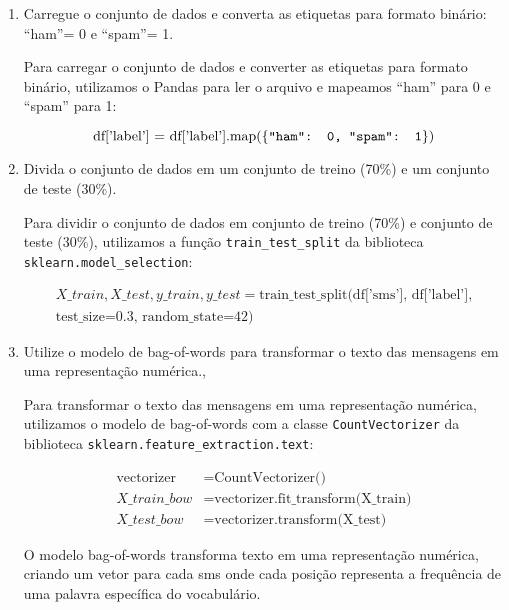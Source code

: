 \begin{enumerate}
    \item Carregue o conjunto de dados e converta as etiquetas para formato binário: ``ham''= 0 e ``spam''= 1.
    \begin{tcolorbox}[title=Resposta:]
        Para carregar o conjunto de dados e converter as etiquetas para formato binário, utilizamos o Pandas para ler o arquivo e mapeamos ``ham'' para 0 e ``spam'' para 1:
        
        \[
        \text{df['label'] = df['label'].map(\{\texttt{``ham'': 0, ``spam'': 1}\})}
        \]
        \end{tcolorbox}
        
        
    \item Divida o conjunto de dados em um conjunto de treino (70\%) e um conjunto de teste (30\%).
    \begin{tcolorbox}[title=Resposta:]
        Para dividir o conjunto de dados em conjunto de treino (70\%) e conjunto de teste (30\%), utilizamos a função \texttt{train\_test\_split} da biblioteca \texttt{sklearn.model\_selection}:
        
        \[
        \begin{aligned}
        X\_train, X\_test, y\_train, y\_test = 
        \text{train\_test\_split(df['sms'], df['label'],} \\
        \text{test\_size=0.3, random\_state=42)}
        \end{aligned}
        \]
        \end{tcolorbox}
        
        
    \item Utilize o modelo de bag-of-words para transformar o texto das mensagens em uma representação numérica.,
    \begin{tcolorbox}[title=Resposta:]
        Para transformar o texto das mensagens em uma representação numérica, utilizamos o modelo de bag-of-words com a classe \texttt{CountVectorizer} da biblioteca \texttt{sklearn.feature\_extraction.text}:
        
        \[
        \begin{aligned}
        \text{vectorizer} &= \text{CountVectorizer()} \\
        X\_train\_bow &= \text{vectorizer.fit\_transform(X\_train)} \\
        X\_test\_bow &= \text{vectorizer.transform(X\_test)}
        \end{aligned}
        \]

        O modelo bag-of-words transforma texto em uma representação numérica, criando um vetor para cada sms onde cada posição representa a frequência de uma palavra específica do vocabulário.

        \end{tcolorbox}
        
\end{enumerate}

